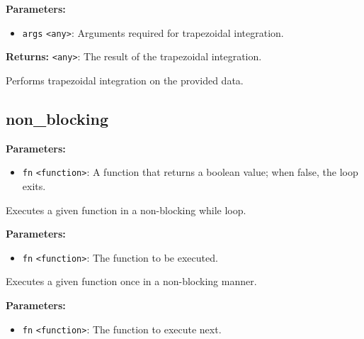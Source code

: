\documentclass[12pt,a4paper]{article}
\begin{document}
\noindent \textbf{Parameters:}
\begin{itemize}
  \item \texttt{args} \texttt{<any>}: Arguments required for trapezoidal integration.
\end{itemize}

\noindent \textbf{Returns:} \texttt{<any>}: The result of the trapezoidal integration.

\noindent Performs trapezoidal integration on the provided data.


\subsection{non\_blocking}
\vspace{5mm}
\noindent {}


\noindent \textbf{Parameters:}
\begin{itemize}
  \item \texttt{fn} \texttt{<function>}: A function that returns a boolean value; when false, the loop exits.
\end{itemize}

\noindent Executes a given function in a non-blocking while loop.

\vspace{5mm}
\noindent {}


\noindent \textbf{Parameters:}
\begin{itemize}
  \item \texttt{fn} \texttt{<function>}: The function to be executed.
\end{itemize}

\noindent Executes a given function once in a non-blocking manner.

\vspace{5mm}
\noindent {}


\noindent \textbf{Parameters:}
\begin{itemize}
  \item \texttt{fn} \texttt{<function>}: The function to execute next.
\end{itemize}
\end{document}
